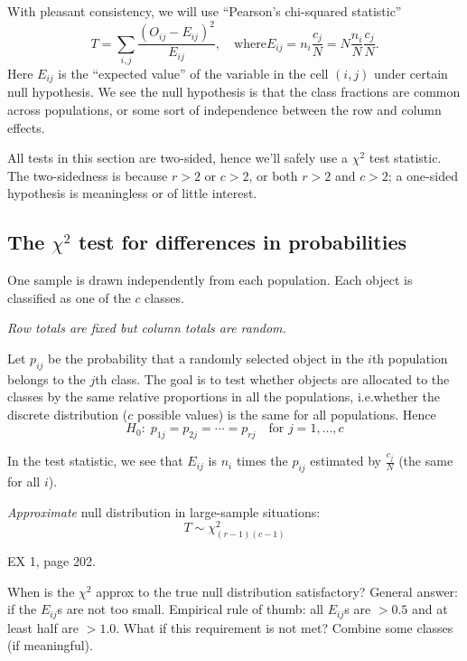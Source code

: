 \documentclass[12pt]{article}
\begin{document}

With pleasant consistency,
we will use ``Pearson's chi-squared statistic''
\[
T = \sum_{i,j} \frac{(O_{ij} - E_{ij})^2}{E_{ij}},
\quad\text{where
$E_{ij} = n_i \frac{c_j}{N} = N\frac{n_i}{N}\frac{c_j}{N}$.}
\]
Here
$E_{ij}$ is the ``expected value'' of the variable in the cell
$(i,j)$ under certain null hypothesis.
We see the null hypothesis is that the class fractions are common across
populations, or some sort of independence between the row and column
effects.

All tests in this section are two-sided,
hence we'll safely use a $\chi^2$ test statistic.
The two-sidedness is because $r > 2$ or $c > 2$,
or both $r > 2$ and $c > 2$; a one-sided hypothesis
is meaningless or of little interest.

\subsection{The $\chi^2$ test for differences in probabilities}

One sample is drawn independently from each population.
Each object is classified as one of the $c$ classes.

\emph{Row totals are fixed but column totals are random.}

Let $p_{ij}$ be the probability that
a randomly selected object in the $i$th population belongs
to the $j$th class. The goal is to test whether
objects are allocated to the classes by the same relative proportions in
all the populations,
i.e.\@ whether the discrete distribution ($c$ possible values)
is the same for all populations.
Hence
\[
H_0:\;
p_{1j} = p_{2j} =\dotsb = p_{rj}
\quad\text{for $j=1,\dotsc,c$}
\]

In the test statistic,
we see that $E_{ij}$ is $n_i$ times the $p_{ij}$
estimated by $\frac{c_j}{N}$ (the same for all $i$).

\emph{Approximate} null distribution in large-sample situations:
\[
T \sim \chi^2_{(r-1)(c-1)}
\]

\example
EX 1, page 202.

\alert
When is the $\chi^2$ approx to the true null distribution satisfactory?
General answer: if the $E_{ij}$s are not too small.
Empirical rule of thumb:
all $E_{ij}$s are $> 0.5$ and at least half are $> 1.0$.
What if this requirement is not met?
Combine some classes (if meaningful).
\end{document}
